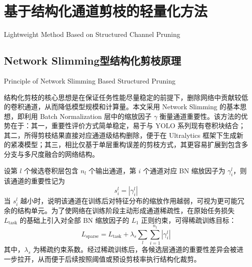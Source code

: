 \begin{figure}[htbp]
  \centering
  \label{fig:fig8a}
\end{figure}

\section{基于结构化通道剪枝的轻量化方法}{Lightweight Method Based on Structured Channel Pruning}

\subsection{Network Slimming型结构化剪枝原理}{Principle of Network Slimming Based Structured Pruning}

结构化剪枝的核心思想是在保证任务性能尽量稳定的前提下，删除网络中贡献较低的卷积通道，从而降低模型规模和计算量。本文采用 Network Slimming 的基本思想，即利用 Batch Normalization 层中的缩放因子 $\gamma$ 衡量通道重要性\cite{liu2017networkslimming}。该方法的优势在于：其一，重要性评价方式简单稳定，易于与 YOLO 系列现有卷积块结合；其二，所得剪枝结果直接对应通道级结构删除，便于在 Ultralytics 框架下生成新的紧凑模型；其三，相比仅基于单层重构误差的剪枝方式，其更容易扩展到包含多分支与多尺度融合的网络结构。

设第 $l$ 个候选卷积层包含 $n_l$ 个输出通道，第 $i$ 个通道对应 BN 缩放因子为 $\gamma_i^l$，则该通道的重要性记为
\begin{equation}
s_i^l = |\gamma_i^l|
\end{equation}
当 $s_i^l$ 越小时，说明该通道在训练后对特征分布的缩放作用越弱，可视为更可能冗余的结构单元。为了使网络在训练阶段主动形成通道稀疏性，在原始任务损失 $L_{\mathrm{task}}$ 的基础上引入对全部 BN 缩放因子的 $L_1$ 正则约束，可得稀疏训练目标：
\begin{equation}
L_{\mathrm{sparse}} = L_{\mathrm{task}} + \lambda_s \sum_{l}\sum_{i=1}^{n_l} |\gamma_i^l|
\end{equation}
其中，$\lambda_s$ 为稀疏约束系数。经过稀疏训练后，各候选层通道的重要性差异会被进一步拉开，从而便于后续按照阈值或预设剪枝率执行结构化裁剪。


